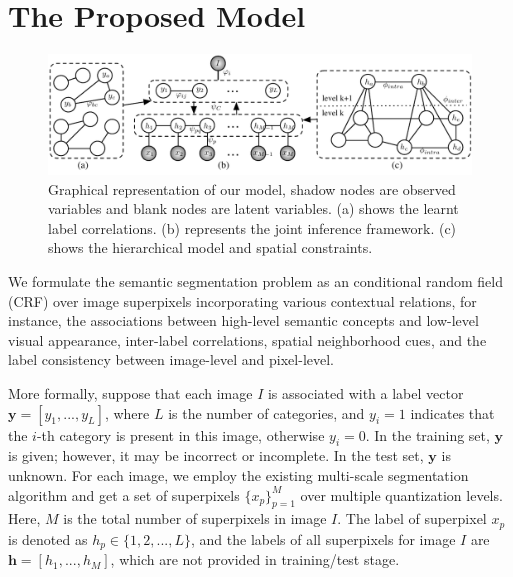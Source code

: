 
\section{The Proposed Model}

\begin{figure}[htb]
    \begin{center}
        \includegraphics[width=0.9\linewidth]{graphmodel.pdf}
    \end{center}
    \vspace{-3mm}
    \caption{Graphical representation of our model, shadow nodes are observed variables and blank nodes are latent variables. (a) shows the learnt label correlations. (b) represents the joint inference framework. (c) shows the hierarchical model and spatial constraints.}
    \label{fig:graphmodel}
\end{figure}

We formulate the semantic segmentation problem as an conditional random field (CRF) over image superpixels incorporating various contextual relations, for instance, the associations between high-level semantic concepts and low-level visual appearance, inter-label correlations, spatial neighborhood cues, and the label consistency between image-level and pixel-level.


More formally, suppose that each image $I$ is associated with a label vector $\boldsymbol{y} = [y_1,...,y_L]$, where $L$ is the number of categories, and $y_i=1$ indicates that the $i$-th category is present in this image, otherwise $y_i=0$. In the training set, $\boldsymbol{y}$ is given; however, it may be incorrect or incomplete. In the test set, $\boldsymbol{y}$ is unknown.
For each image, we employ the existing multi-scale segmentation algorithm and get a set of superpixels   $\{x_p\}_{p=1}^M$ over multiple quantization levels.
Here, $M$ is the total number of superpixels in image $I$.
The label of superpixel $x_p$ is denoted as $h_p\in \{1,2,...,L\}$, and the labels of all superpixels for image $I$ are $\boldsymbol{h}=[h_1,...,h_M]$, which are not provided in training/test stage.

